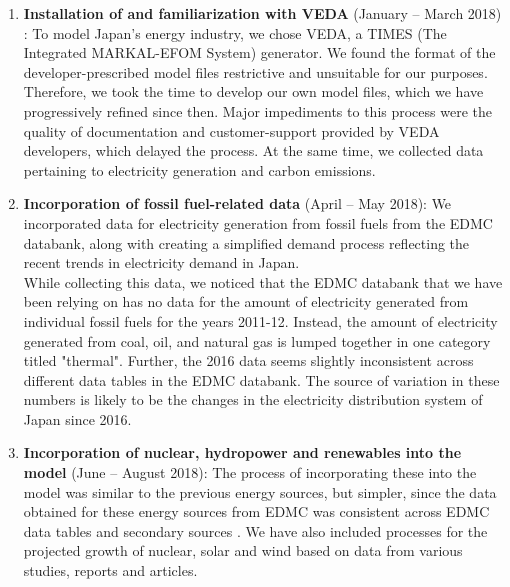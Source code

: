 \documentclass[14pt,a4paper]{article} %
\begin{document}
\begin{enumerate}
\item \textbf{Installation of and familiarization with VEDA} (January – March 2018) : To model Japan's energy industry, we chose VEDA, a TIMES (The Integrated MARKAL-EFOM System) \cite{loulou_documentation_2005} \cite{gargiulo_documentation_2005} generator. We found the format of the developer-prescribed model files restrictive and unsuitable for our purposes. Therefore, we took the time to develop our own model files, which we have progressively refined since then. Major impediments to this process were the quality of documentation and customer-support provided by VEDA developers, which delayed the process.
At the same time, we collected data pertaining to electricity generation and carbon emissions.

\item \textbf{Incorporation of fossil fuel-related data} (April – May 2018): We incorporated data for electricity generation from fossil fuels from the EDMC databank\cite{noauthor_energy_2018}, along with creating a simplified demand process reflecting the recent trends in electricity demand in Japan. \\

While collecting this data, we noticed that the EDMC databank that we have been relying on has no data for the amount of electricity generated from individual fossil fuels for the years 2011-12. Instead, the amount of electricity generated from coal, oil, and natural gas is lumped together in one category titled "thermal". Further, the 2016 data seems slightly inconsistent across different data tables in the EDMC databank. The source of variation in these numbers is likely to be the changes in the electricity distribution system of Japan since 2016.

\item \textbf{Incorporation of nuclear, hydropower and renewables into the model} (June – August 2018): The process of incorporating these into the model was similar to the previous energy sources, but simpler, since the data obtained for these energy sources from EDMC was consistent across EDMC data tables and secondary sources \cite{noauthor_energy_2018} \cite{noauthor_iea_2017} \cite{noauthor_japan_2017}. We have also included processes for the projected growth of nuclear, solar and wind based on data from various studies, reports and articles. \cite{publicover_japan_2017} \cite{publicover_japan_2017} \cite{dincer_analysis_2011} \cite{noauthor_geothermal_2018} \cite{heger_wind_2016} \cite{noauthor_operational_2013} \cite{noauthor_electricity_2017}


\end{enumerate}
\end{document}
